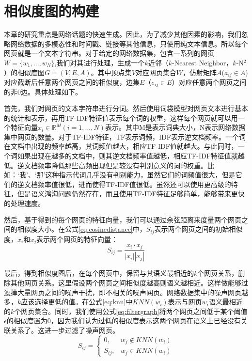 \section{相似度图的构建}\label{sec:constructsimilaritygraph}

本章的研究重点是网络话题的快速生成。因此，为了减少其他因素的影响，我们忽略网络数据的多模态性和时间戳、链接等其他信息，只使用纯文本信息。所以每个网页就是一个文本字符串。对于给定的网络数据集，包含一系列的网页$W=\{w_1,...,w_N\}$,我们对其进行处理，生成一个$k$近邻（$k$-Nearest Neighbor，$k$-N$^2$）的相似度图$G=(V,E,A)$。其中顶点集$V$对应网页集合$W$，仿射矩阵$A$($a_{ij}\in A$)对应截断后任意两个网页之间的相似度，边集$E$（$e_{ij}\in E$）对应任意两个网页之间的非$0$边\citep{pang-2013-unsupervised,pang-tao-2016-lpd}。具体处理如下。

首先，我们对网页的文本字符串进行分词。然后使用词袋模型\citep{harris1954distributional}对网页文本进行基本的统计和表示，再用TF-IDF特征值表示每个词的权重，这样每个网页就可以用一个特征向量$x_i\in \mathbb{R}^M(i=1,...,N)$表示。其中M是表示词典大小，N表示网络数据集中网页的数量。对于TF-IDF特征，TF表示词频，IDF表示逆文档频率。一个词在文档中出现的频率越高，其词频值越大，相应TF-IDF值就越大。与此同时，一个词如果出现在越多的文档中，则其逆文档频率值越低，相应TF-IDF特征值就越低。逆文档频率降低那些高频出现但是较没有判别意义的词的权重。比如：‘我’、‘那’这种指示代词几乎没有判别能力，虽然它们的词频值很大，但是它们的逆文档频率值很低，进而使得TF-IDF值很低。虽然还可以使用更高级的特征，但是语义鸿沟问题仍然存在，而且使用TF-IDF特征足够简单，能够带来更快的处理速度。

然后，基于得到的每个网页的特征向量，我们可以通过余弦距离来度量两个网页之间的相似度大小。在公式\ref{eq:cosinedistance}中，$S_{ij}$表示两个网页之间的初始相似度，$x_i$和$x_j$表示两个网页的特征向量：
\begin{equation}\label{eq:cosinedistance}
    S_{ij} = \frac{x_i\cdot x_j}{|x_i||x_j|}
\end{equation}

最后，得到相似度图后，在每个网页中，保留与其语义最相近的$k$个网页关系，删除其他网页关系。这里假设两个网页之间相似度越高则语义越相近。这样做能够过滤掉大量网页之间的噪声干扰，即不相关的噪声网页。网络数据集中的噪声网页越多，$k$应该选择更低的值。在公式\ref{eq:knn}中$KNN(w_i)$表示与网页$w_i$语义最相近的$k$个网页集合。同时，我们使用公式\ref{eq:filtergraph}将两个网页之间低于某个阈值$\epsilon$的相似度置为$0$，因为我们认为过低的相似度表示这两个网页在语义上已经没有关联关系了。这进一步过滤了噪声网页。
\begin{equation}\label{eq:knn}
S_{ij} =
\begin{cases}
0, &  w_j \notin KNN(w_i) \\
S_{ij}, & w_j \in KNN(w_i)
\end{cases}
\end{equation}

